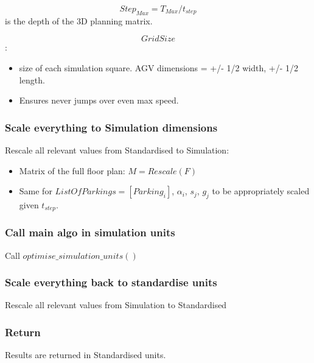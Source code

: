 \documentclass[12pt,a4paper]{article}
\begin{document}
\[
{Step}_{Max} = T_{Max} / t_{step}
\]
is the depth of the 3D planning matrix.

\[
GridSize
\]
:

\begin{itemize}
\item size of each simulation square. AGV dimensions = +/- 1/2 width, +/- 1/2 length.


\item Ensures never jumps over even max speed.

\end{itemize}
\subsubsection{Scale everything to Simulation dimensions}
Rescale all relevant values from Standardised to Simulation:

\begin{itemize}
\item Matrix of the full floor plan: $M = Rescale(F)$


\item Same for $ListOfParkings = [Parking_i]$, $\alpha_i$, $s_j$, $g_j$ to be appropriately scaled given $t_{step}$.

\end{itemize}
\subsubsection{Call main algo in simulation units}
Call $optimise\_simulation\_units()$

\subsubsection{Scale everything back to standardise units}
Rescale all relevant values from Simulation to Standardised

\subsubsection{Return}
Results are returned in Standardised units.
\end{document}
